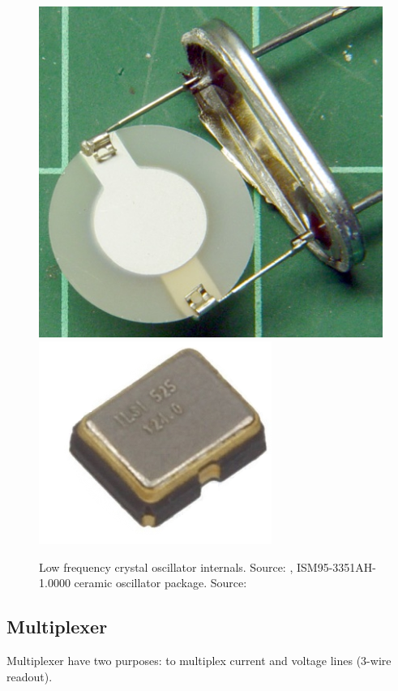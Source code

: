         \begin{figure}[H]
            \centering
            \includegraphics[width=0.35\paperwidth]{img/06/crystal.png}
                        \includegraphics[width=0.35\paperwidth]{img/06/ISM95.png}
            \caption{Low frequency crystal oscillator internals. Source: \cite{Opening_a_Quartz_Crystal_Can_Effects_Thereof}, ISM95-3351AH-1.0000 ceramic oscillator package. Source: \cite{ISM95_series_datasheet}}
            \label{crystal_oscillator_difference}
        \end{figure}

    \subsection{Multiplexer}
        Multiplexer have two purposes: to multiplex current and voltage lines (3-wire readout).

